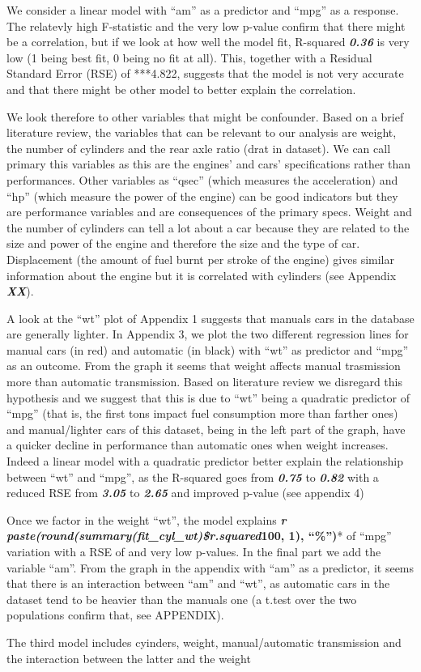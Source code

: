 \documentclass[]{article}
\begin{document}
We consider a linear model with ``am'' as a predictor and ``mpg'' as a
response. The relatevly high F-statistic and the very low p-value
confirm that there might be a correlation, but if we look at how well
the model fit, R-squared \textbf{\emph{0.36}} is very low (1 being best
fit, 0 being no fit at all). This, together with a Residual Standard
Error (RSE) of ***4.822, suggests that the model is not very accurate
and that there might be other model to better explain the correlation.

We look therefore to other variables that might be confounder. Based on
a brief literature review, the variables that can be relevant to our
analysis are weight, the number of cylinders and the rear axle ratio
(drat in dataset). We can call primary this variables as this are the
engines' and cars' specifications rather than performances. Other
variables as ``qsec'' (which measures the acceleration) and ``hp''
(which measure the power of the engine) can be good indicators but they
are performance variables and are consequences of the primary specs.
Weight and the number of cylinders can tell a lot about a car because
they are related to the size and power of the engine and therefore the
size and the type of car. Displacement (the amount of fuel burnt per
stroke of the engine) gives similar information about the engine but it
is correlated with cylinders (see Appendix \textbf{\emph{XX}}).

A look at the ``wt'' plot of Appendix 1 suggests that manuals cars in
the database are generally lighter. In Appendix 3, we plot the two
different regression lines for manual cars (in red) and automatic (in
black) with ``wt'' as predictor and ``mpg'' as an outcome. From the
graph it seems that weight affects manual trasmission more than
automatic transmission. Based on literature review we disregard this
hypothesis and we suggest that this is due to ``wt'' being a quadratic
predictor of ``mpg'' (that is, the first tons impact fuel consumption
more than farther ones) and manual/lighter cars of this dataset, being
in the left part of the graph, have a quicker decline in performance
than automatic ones when weight increases. Indeed a linear model with a
quadratic predictor better explain the relationship between ``wt'' and
``mpg'', as the R-squared goes from \textbf{\emph{0.75}} to
\textbf{\emph{0.82}} with a reduced RSE from \textbf{\emph{3.05}} to
\textbf{\emph{2.65}} and improved p-value (see appendix 4)

Once we factor in the weight ``wt'', the model explains \textbf{\emph{r
paste(round(summary(fit\_cyl\_wt)\$r.squared}100, 1), ``\%'')}* of
``mpg'' variation with a RSE of and very low p-values. In the final part
we add the variable ``am''. From the graph in the appendix with ``am''
as a predictor, it seems that there is an interaction between ``am'' and
``wt'', as automatic cars in the dataset tend to be heavier than the
manuals one (a t.test over the two populations confirm that, see
APPENDIX).

The third model includes cyinders, weight, manual/automatic transmission
and the interaction between the latter and the weight
\end{document}
